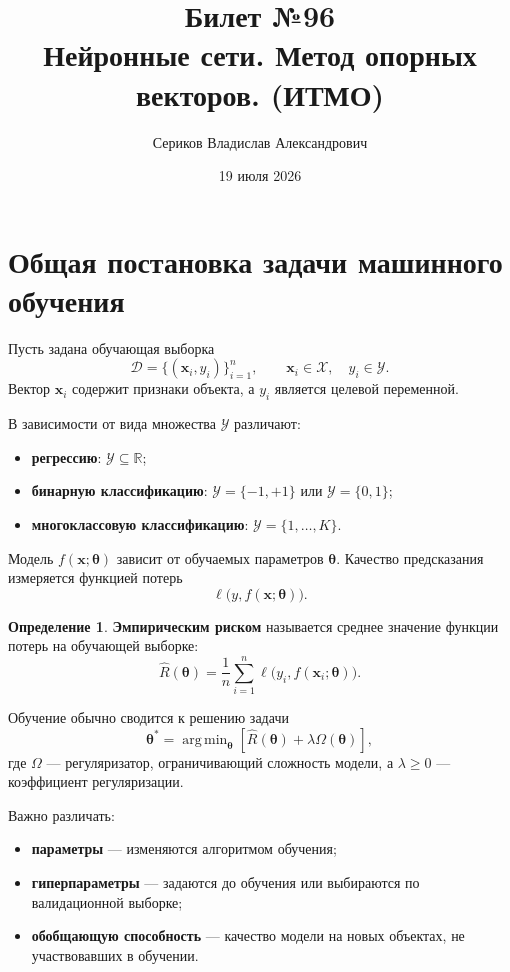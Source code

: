 \documentclass[12pt,a4paper]{article}
\title{Билет №96 \\ \small Нейронные сети. Метод опорных векторов. (ИТМО)}
\author{Сериков Владислав Александрович}
\date{19 июля 2026}
\theoremstyle{definition}
\newtheorem{definition}[theorem]{Определение}
\newcommand{\R}{\mathbb{R}}
\newcommand{\1}{\mathbf{1}}
\DeclareMathOperator{\argmin}{arg\,min}
\begin{document}
\maketitle
\tableofcontents
\newpage

\section{Общая постановка задачи машинного обучения}

Пусть задана обучающая выборка
\[
    \mathcal{D}
    =
    \{(\bm{x}_i,y_i)\}_{i=1}^{n},
    \qquad
    \bm{x}_i\in\mathcal{X},
    \quad
    y_i\in\mathcal{Y}.
\]
Вектор $\bm{x}_i$ содержит признаки объекта, а $y_i$ является целевой
переменной.

В зависимости от вида множества $\mathcal{Y}$ различают:

\begin{itemize}
    \item \textbf{регрессию}: $\mathcal{Y}\subseteq\R$;
    \item \textbf{бинарную классификацию}: $\mathcal{Y}=\{-1,+1\}$
    или $\mathcal{Y}=\{0,1\}$;
    \item \textbf{многоклассовую классификацию}:
    $\mathcal{Y}=\{1,\ldots,K\}$.
\end{itemize}

Модель $f(\bm{x};\bm{\theta})$ зависит от обучаемых параметров
$\bm{\theta}$. Качество предсказания измеряется функцией потерь
\[
    \ell\bigl(y,f(\bm{x};\bm{\theta})\bigr).
\]

\begin{definition}
\textbf{Эмпирическим риском} называется среднее значение функции потерь
на обучающей выборке:
\[
    \widehat{R}(\bm{\theta})
    =
    \frac{1}{n}
    \sum_{i=1}^{n}
    \ell\bigl(y_i,f(\bm{x}_i;\bm{\theta})\bigr).
\]
\end{definition}

Обучение обычно сводится к решению задачи
\[
    \bm{\theta}^{*}
    =
    \argmin_{\bm{\theta}}
    \left[
        \widehat{R}(\bm{\theta})
        +
        \lambda \Omega(\bm{\theta})
    \right],
\]
где $\Omega$ --- регуляризатор, ограничивающий сложность модели,
а $\lambda\geq 0$ --- коэффициент регуляризации.

Важно различать:

\begin{itemize}
    \item \textbf{параметры} --- изменяются алгоритмом обучения;
    \item \textbf{гиперпараметры} --- задаются до обучения или выбираются
    по валидационной выборке;
    \item \textbf{обобщающую способность} --- качество модели на новых
    объектах, не участвовавших в обучении.
\end{itemize}
\end{document}
